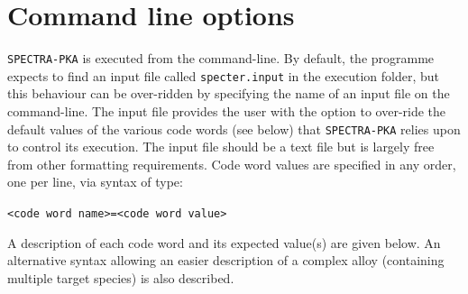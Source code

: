 \documentclass[a4paper]{article}
\begin{document}
\section{Command line options}
\texttt{SPECTRA-PKA} is executed from the command-line. By default, the programme expects to find an input file called \texttt{specter.input} in the execution folder, but this behaviour can be over-ridden by specifying the name of an input file on the command-line. The input file provides the user with the option to over-ride the default values of the various code words (see below) that \texttt{SPECTRA-PKA} relies upon to control its execution. The input file should be a text file but is largely free from other formatting requirements. Code word values are specified in any order, one per line, via syntax of type:
\begin{center}
\texttt{<code word name>=<code word value>}
\end{center}
A description of each code word and its expected value(s) are given below. An alternative syntax allowing an easier description of a complex alloy (containing multiple target species) is also described.
\end{document}
